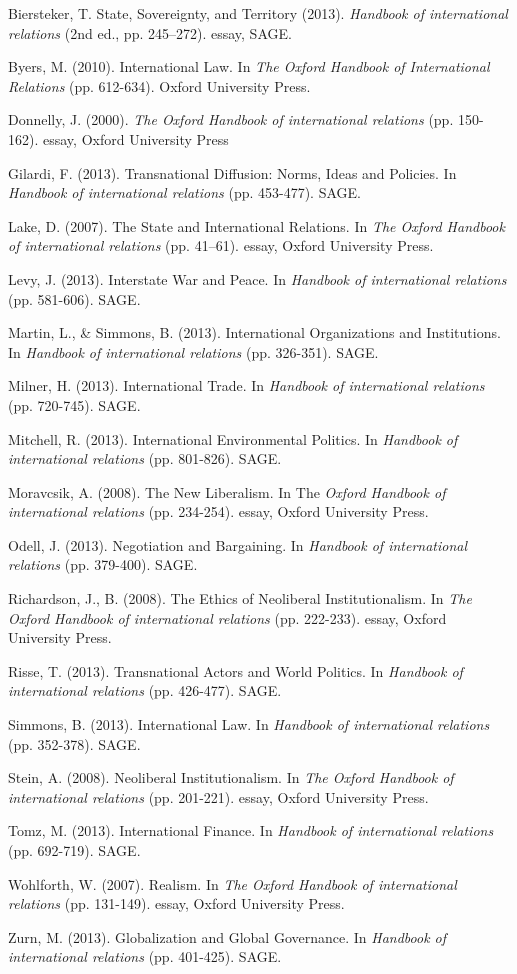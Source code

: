 \documentclass[11pt]{article}
\begin{document}
\begin{references}
\item Biersteker, T. State, Sovereignty, and Territory (2013). \textit{Handbook of international relations} (2nd ed., pp. 245–272). essay, SAGE.
\item Byers, M. (2010). International Law. In \textit{The Oxford Handbook of International Relations} (pp. 612-634). Oxford University Press.
\item Donnelly, J. (2000). \textit{The Oxford Handbook of international relations} (pp. 150-162). essay, Oxford University Press
\item Gilardi, F. (2013). Transnational Diffusion: Norms, Ideas and Policies. In \textit{Handbook of international relations} (pp. 453-477). SAGE.
\item Lake, D. (2007). The State and International Relations. In \textit{The Oxford Handbook of international relations} (pp. 41–61). essay, Oxford University Press.
\item Levy, J. (2013). Interstate War and Peace. In \textit{Handbook of international relations} (pp. 581-606). SAGE.
\item Martin, L., \& Simmons, B. (2013). International Organizations and Institutions. In \textit{Handbook of international relations} (pp. 326-351). SAGE.
\item Milner, H. (2013). International Trade. In \textit{Handbook of international relations} (pp. 720-745). SAGE.
\item Mitchell, R. (2013). International Environmental Politics. In \textit{Handbook of international relations} (pp. 801-826). SAGE.
\item Moravcsik, A. (2008). The New Liberalism. In The \textit{Oxford Handbook of international relations} (pp. 234-254). essay, Oxford University Press.
\item Odell, J. (2013). Negotiation and Bargaining. In \textit{Handbook of international relations} (pp. 379-400). SAGE.
\item Richardson, J., B. (2008). The Ethics of Neoliberal Institutionalism. In \textit{The Oxford Handbook of international relations} (pp. 222-233). essay, Oxford University Press.
\item Risse, T. (2013). Transnational Actors and World Politics. In \textit{Handbook of international relations} (pp. 426-477). SAGE.
\item Simmons, B. (2013). International Law. In \textit{Handbook of international relations} (pp. 352-378). SAGE.
\item Stein, A. (2008). Neoliberal Institutionalism. In \textit{The Oxford Handbook of international relations} (pp. 201-221). essay, Oxford University Press.
\item Tomz, M. (2013). International Finance. In \textit{Handbook of international relations} (pp. 692-719). SAGE.
\item Wohlforth, W. (2007). Realism. In \textit{The Oxford Handbook of international relations} (pp. 131-149). essay, Oxford University Press.
\item Zurn, M. (2013). Globalization and Global Governance. In \textit{Handbook of international relations} (pp. 401-425). SAGE.
\end{references}
\end{document}
